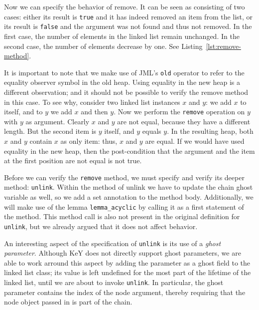 \documentclass[runningheads]{llncs}
\def\bs{\char092}
\begin{document}
Now we can specify the behavior of remove. It can be seen as consisting of two cases: either its result is \texttt{true} and it has indeed removed an item from the list, or its result is \texttt{false} and the argument was not found and thus not removed. In the first case, the number of elements in the linked list remain unchanged. In the second case, the number of elements decrease by one. See Listing~\ref{lst:remove-method}.

It is important to note that we make use of JML's \texttt{\bs old} operator to refer to the equality observer symbol in the old heap. Using equality in the new heap is a different observation; and it should not be possible to verify the remove method in this case. To see why, consider two linked list instances $x$ and $y$: we add $x$ to itself, and to $y$ we add $x$ and then $y$. Now we perform the \texttt{remove} operation on $y$ with $y$ as argument. Clearly $x$ and $y$ are not equal, because they have a different length. But the second item is $y$ itself, and $y$ equals $y$. In the resulting heap, both $x$ and $y$ contain $x$ as only item: thus, $x$ and $y$ are equal. If we would have used equality in the new heap, then the post-condition that the argument and the item at the first position are not equal is not true.



Before we can verify the \texttt{remove} method, we must specify and verify its deeper method: \texttt{unlink}. Within the method of unlink we have to update the chain ghost variable as well, so we add a set annotation to the method body. Additionally, we will make use of the lemma \texttt{lemma\_acyclic} by calling it as a first statement of the method. This method call is also not present in the original definition for \texttt{unlink}, but we already argued that it does not affect behavior.

An interesting aspect of the specification of \texttt{unlink} is its use of a \emph{ghost parameter}. Although KeY does not directly support ghost parameters, we are able to work arround this aspect by adding the parameter as a ghost field to the linked list class; its value is left undefined for the most part of the lifetime of the linked list, until we are about to invoke \texttt{unlink}. In particular, the ghost parameter contains the index of the node argument, thereby requiring that the node object passed in is part of the chain.
\end{document}
